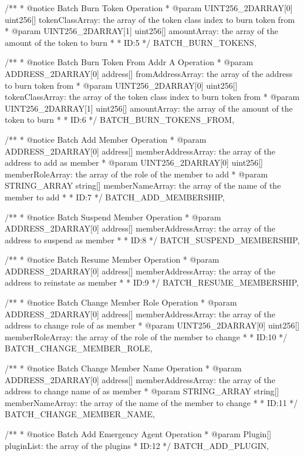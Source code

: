 \documentclass[main.tex]{subfiles}
\begin{document}
\begin{spverbatim}
  /**
   * @notice Batch Burn Token Operation
   * @param UINT256_2DARRAY[0] uint256[] tokenClassArray: the array of the token class index to burn token from
   * @param UINT256_2DARRAY[1] uint256[] amountArray: the array of the amount of the token to burn
   * 
   * ID:5
   */
  BATCH_BURN_TOKENS,

  /**
   * @notice Batch Burn Token From Addr A Operation
   * @param ADDRESS_2DARRAY[0] address[] fromAddressArray: the array of the address to burn token from
   * @param UINT256_2DARRAY[0] uint256[] tokenClassArray: the array of the token class index to burn token from
   * @param UINT256_2DARRAY[1] uint256[] amountArray: the array of the amount of the token to burn
   * 
   * ID:6
   */
  BATCH_BURN_TOKENS_FROM,

  /**
   * @notice Batch Add Member Operation
   * @param ADDRESS_2DARRAY[0] address[] memberAddressArray: the array of the address to add as member
   * @param UINT256_2DARRAY[0] uint256[] memberRoleArray: the array of the role of the member to add
   * @param STRING_ARRAY string[] memberNameArray: the array of the name of the member to add
   * 
   * ID:7
   */
  BATCH_ADD_MEMBERSHIP,

  /**
   * @notice Batch Suspend Member Operation
   * @param ADDRESS_2DARRAY[0] address[] memberAddressArray: the array of the address to suspend as member
   * 
   * ID:8
   */
  BATCH_SUSPEND_MEMBERSHIP,

  /**
   * @notice Batch Resume Member Operation
   * @param ADDRESS_2DARRAY[0] address[] memberAddressArray: the array of the address to reinstate as member
   * 
   * ID:9
   */
  BATCH_RESUME_MEMBERSHIP,

  /**
   * @notice Batch Change Member Role Operation
   * @param ADDRESS_2DARRAY[0] address[] memberAddressArray: the array of the address to change role of as member
   * @param UINT256_2DARRAY[0] uint256[] memberRoleArray: the array of the role of the member to change
   * 
   * ID:10
   */
  BATCH_CHANGE_MEMBER_ROLE,

  /**
   * @notice Batch Change Member Name Operation
   * @param ADDRESS_2DARRAY[0] address[] memberAddressArray: the array of the address to change name of as member
   * @param STRING_ARRAY string[] memberNameArray: the array of the name of the member to change
   * 
   * ID:11
   */
  BATCH_CHANGE_MEMBER_NAME,

  /**
   * @notice Batch Add Emergency Agent Operation
   * @param Plugin[] pluginList: the array of the plugins
   * ID:12
   */
  BATCH_ADD_PLUGIN,


\end{spverbatim}
\end{document}
